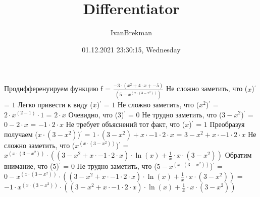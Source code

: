 \documentclass{article}
\title{Differentiator}
\author{IvanBrekman}
\date{01.12.2021 23:30:15, Wednesday}
\begin{document}
\maketitle

Продифференуируем функцию f = $ \frac{-3 \cdot ({x}^{2} + 4 \cdot x + -5)}{(5 - {x}^{(x \cdot (3 - {x}^{2}))})} $\newline
Не сложно заметить, что \newline
($ x $)$ ^\prime $ = $ 1 $\newline
\newline
Легко привести к виду \newline
($ x $)$ ^\prime $ = $ 1 $\newline
\newline
Не сложно заметить, что \newline
($ {x}^{2} $)$ ^\prime $ = $ 2 \cdot {x}^{(2 - 1)} \cdot 1 $ = $ 2 \cdot x $\newline
\newline
Очевидно, что \newline
($ 3 $)$ ^\prime $ = $ 0 $\newline
\newline
Не трудно заметить, что \newline
($ 3 - {x}^{2} $)$ ^\prime $ = $ 0 - 2 \cdot x $ = $ -1 \cdot 2 \cdot x $\newline
\newline
Не требует объяснений тот факт, что \newline
($ x $)$ ^\prime $ = $ 1 $\newline
\newline
Преобразуя получаем \newline
($ x \cdot (3 - {x}^{2}) $)$ ^\prime $ = $ 1 \cdot (3 - {x}^{2}) + x \cdot -1 \cdot 2 \cdot x $ = $ 3 - {x}^{2} + x \cdot -1 \cdot 2 \cdot x $\newline
\newline
Не сложно заметить, что \newline
($ {x}^{(x \cdot (3 - {x}^{2}))} $)$ ^\prime $ = $ {x}^{(x \cdot (3 - {x}^{2}))} \cdot ((3 - {x}^{2} + x \cdot -1 \cdot 2 \cdot x) \cdot \ln{(x)} + \frac{1}{x} \cdot x \cdot (3 - {x}^{2})) $\newline
\newline
Обратим внимание, что \newline
($ 5 $)$ ^\prime $ = $ 0 $\newline
\newline
Не трудно заметить, что \newline
($ 5 - {x}^{(x \cdot (3 - {x}^{2}))} $)$ ^\prime $ = $ 0 - {x}^{(x \cdot (3 - {x}^{2}))} \cdot ((3 - {x}^{2} + x \cdot -1 \cdot 2 \cdot x) \cdot \ln{(x)} + \frac{1}{x} \cdot x \cdot (3 - {x}^{2})) $ = $ -1 \cdot {x}^{(x \cdot (3 - {x}^{2}))} \cdot ((3 - {x}^{2} + x \cdot -1 \cdot 2 \cdot x) \cdot \ln{(x)} + \frac{1}{x} \cdot x \cdot (3 - {x}^{2})) $\newline
\end{document}
